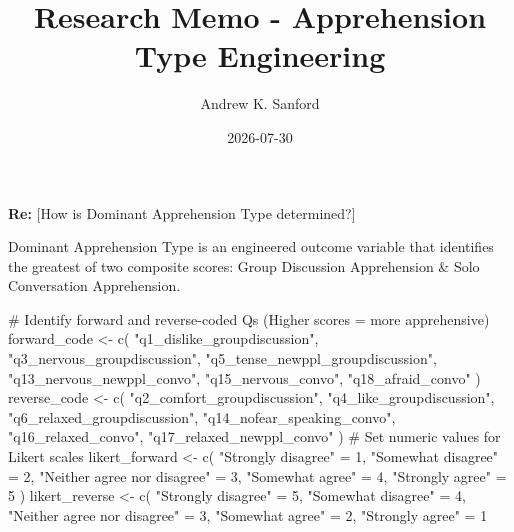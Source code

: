 \documentclass[
  11pt,
  letterpaper,
]{article}
\title{Research Memo - Apprehension Type Engineering}
\author{Andrew K. Sanford}
\date{2026-07-30}
\newenvironment{Shaded}{\begin{snugshade}}{\end{snugshade}}
\newcommand{\CommentTok}[1]{\textcolor[rgb]{0.37,0.37,0.37}{#1}}
\newcommand{\DecValTok}[1]{\textcolor[rgb]{0.68,0.00,0.00}{#1}}
\newcommand{\FunctionTok}[1]{\textcolor[rgb]{0.28,0.35,0.67}{#1}}
\newcommand{\NormalTok}[1]{\textcolor[rgb]{0.00,0.23,0.31}{#1}}
\newcommand{\OtherTok}[1]{\textcolor[rgb]{0.00,0.23,0.31}{#1}}
\newcommand{\StringTok}[1]{\textcolor[rgb]{0.13,0.47,0.30}{#1}}
\begin{document}
\maketitle


\textbf{Re:} {[}How is Dominant Apprehension Type determined?{]}

Dominant Apprehension Type is an engineered outcome variable that
identifies the greatest of two composite scores: Group Discussion
Apprehension \& Solo Conversation Apprehension.

\begin{Shaded}
\begin{Highlighting}[]
\CommentTok{\# Identify forward and reverse{-}coded Q\textquotesingle{}s (Higher scores = more apprehensive)}
\NormalTok{forward\_code }\OtherTok{\textless{}{-}} \FunctionTok{c}\NormalTok{(}
  \StringTok{"q1\_dislike\_groupdiscussion"}\NormalTok{, }\StringTok{"q3\_nervous\_groupdiscussion"}\NormalTok{,}
  \StringTok{"q5\_tense\_newppl\_groupdiscussion"}\NormalTok{, }\StringTok{"q13\_nervous\_newppl\_convo"}\NormalTok{,}
  \StringTok{"q15\_nervous\_convo"}\NormalTok{, }\StringTok{"q18\_afraid\_convo"}
\NormalTok{  )}
\NormalTok{reverse\_code }\OtherTok{\textless{}{-}} \FunctionTok{c}\NormalTok{(}
  \StringTok{"q2\_comfort\_groupdiscussion"}\NormalTok{, }\StringTok{"q4\_like\_groupdiscussion"}\NormalTok{,}
  \StringTok{"q6\_relaxed\_groupdiscussion"}\NormalTok{, }\StringTok{"q14\_nofear\_speaking\_convo"}\NormalTok{,}
  \StringTok{"q16\_relaxed\_convo"}\NormalTok{, }\StringTok{"q17\_relaxed\_newppl\_convo"}
\NormalTok{  )}
\CommentTok{\# Set numeric values for Likert scales}
\NormalTok{likert\_forward }\OtherTok{\textless{}{-}} \FunctionTok{c}\NormalTok{(}
  \StringTok{"Strongly disagree"}          \OtherTok{=} \DecValTok{1}\NormalTok{,}
  \StringTok{"Somewhat disagree"}          \OtherTok{=} \DecValTok{2}\NormalTok{,}
  \StringTok{"Neither agree nor disagree"} \OtherTok{=} \DecValTok{3}\NormalTok{,}
  \StringTok{"Somewhat agree"}             \OtherTok{=} \DecValTok{4}\NormalTok{,}
  \StringTok{"Strongly agree"}             \OtherTok{=} \DecValTok{5}
\NormalTok{)}
\NormalTok{likert\_reverse }\OtherTok{\textless{}{-}} \FunctionTok{c}\NormalTok{(}
  \StringTok{"Strongly disagree"}          \OtherTok{=} \DecValTok{5}\NormalTok{,}
  \StringTok{"Somewhat disagree"}          \OtherTok{=} \DecValTok{4}\NormalTok{,}
  \StringTok{"Neither agree nor disagree"} \OtherTok{=} \DecValTok{3}\NormalTok{,}
  \StringTok{"Somewhat agree"}             \OtherTok{=} \DecValTok{2}\NormalTok{,}
  \StringTok{"Strongly agree"}             \OtherTok{=} \DecValTok{1}

\end{Highlighting}
\end{Shaded}
\end{document}
